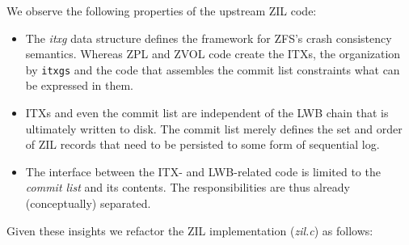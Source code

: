 \documentclass[12pt,a4paper,twoside]{book}
\begin{document}
We observe the following properties of the upstream ZIL code:
\begin{itemize}[noitemsep]
    \item The \textit{itxg} data structure defines the framework for ZFS's crash consistency semantics.
          Whereas ZPL and ZVOL code create the ITXs, the organization by \lstinline{itxgs} and the code that assembles the commit list constraints what can be expressed in them.
    \item ITXs and even the commit list are independent of the LWB chain that is ultimately written to disk.
          The commit list merely defines the set and order of ZIL records that need to be persisted to some form of sequential log.
    \item The interface between the ITX- and LWB-related code is limited to the \textit{commit list} and its contents.
        The responsibilities are thus already (conceptually) separated.
\end{itemize}
Given these insights we refactor the ZIL implementation (\textit{zil.c}) as follows:
\end{document}

